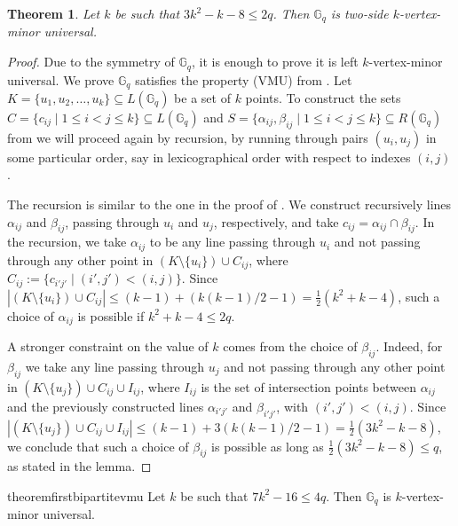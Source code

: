 \documentclass[10pt,a4paper]{article}
\newtheorem{theorem}{Theorem}[section]
\newcommand{\ls}{\leqslant}
\newcommand{\G}[1][q]{\mathbb{G}_{#1}}
\begin{document}
\begin{theorem}\label{theo:bipartite-kvmu}
    Let $k$ be such that $3k^2-k-8 \ls 2q$. Then $\G$ is two-side  $k$-vertex-minor universal.
\end{theorem}


\begin{proof}
    Due to the symmetry of $\G$, it is enough to prove it is left $k$-vertex-minor universal. We prove $\G$ satisfies the property (VMU) from . Let  $K = \{u_1, u_2, \dots, u_k\} \subseteq L(\G)$ be a set of $k$  points. To construct the sets
    $C = \{c_{ij} \mid 1 \ls i < j \ls k \} \subseteq L(\G)$ and
    $S = \{\alpha_{ij},\beta_{ij} \mid 1 \ls i < j \ls k \} \subseteq R(\G)$ from  we will proceed again by recursion, by running through pairs $(u_i, u_j)$ in some particular order, say in lexicographical order with respect to indexes $(i,j)$.

    \medskip \noindent The recursion is similar to the one in the proof of .  We construct recursively lines $\alpha_{ij}$ and $\beta_{ij}$, passing through $u_i$ and $u_j$, respectively, and take $c_{ij} = \alpha_{ij} \cap \beta_{ij}$. In the recursion, we  take $\alpha_{ij}$ to be any line passing through $u_{i}$ and not passing through any other point in $\left(K\setminus\{u_{i}\}\right) \cup C_{ij}$, where $C_{ij} := \{ c_{i'j'} \mid (i',j') < (i,j)\}$. Since $|\left(K\setminus\{u_{i}\}\right)\cup C_{ij}| \ls (k-1) + (k(k-1)/2-1) = \frac{1}{2}(k^2+k-4)$, such a choice of $\alpha_{ij}$ is possible if  $k^2+k-4 \ls 2q$.

    \medskip \noindent A stronger constraint on the value of $k$ comes from the choice of $\beta_{ij}$. Indeed, for $\beta_{ij}$ we take any line passing through $u_{j}$ and not passing through any other point in $(K\setminus\{u_{j}\}) \cup C_{ij} \cup I_{ij}$, where $I_{ij}$ is the set of intersection points between $\alpha_{ij}$ and the previously constructed lines $\alpha_{i'j'}$ and $\beta_{i'j'}$, with $(i',j') < (i,j)$. Since $|(K\setminus\{u_{j}\}) \cup C_{ij} \cup I_{ij}| \ls (k-1) + 3(k(k-1)/2-1) = \frac{1}{2}(3k^2-k-8)$, we conclude that such a choice of $\beta_{ij}$ is possible as long as $\frac{1}{2}(3k^2-k-8) \ls q$, as stated in the lemma.
\end{proof}

\begin{restatable}{theorem}{firstbipartitevmu}
    \label{theo:bipartite-vmu}
    Let $k$ be such that $7k^2 - 16 \ls 4q$. Then $\G$ is $k$-vertex-minor universal.
\end{restatable}
\end{document}
